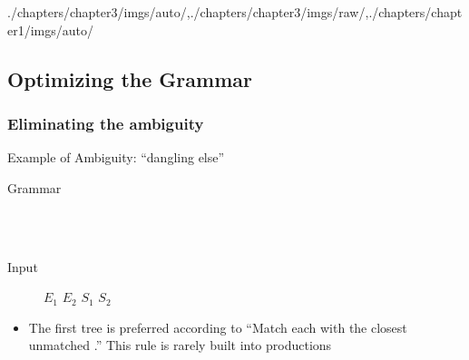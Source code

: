 \begin{graphicspathcontext}{{./chapters/chapter3/imgs/auto/},{./chapters/chapter3/imgs/raw/},{./chapters/chapter1/imgs/auto/}}
\begin{bibunit}[apalike]
\subsection{Optimizing the Grammar}
\subsubsectiontableofcontentslide*

\subsubsection{Eliminating the ambiguity}

\begin{frame}[t]{{Example of Ambiguity:} ``dangling else''}
	\begin{small}
	\begin{description}
	\item[Grammar]
			\begin{bnf}
				 \\
				 \\
			\end{bnf}
	\item[Input]  $E_1$   $E_2$  $S_1$  $S_2$
	\end{description}
	\hfill
	\begin{itemize}
	\item The first tree is preferred according to ``Match each  with the closest unmatched .'' This rule is rarely built into productions
	\end{itemize}
	\end{small}
\end{frame}


\end{bibunit}
\end{graphicspathcontext}
